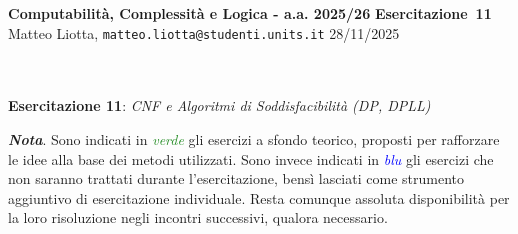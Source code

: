 \documentclass[a4paper,10pt]{article}
\makeatletter
\newcommand{\EsercitazioneNum}{11}
\newcommand{\Data}{28/11/2025}
\newcommand{\DocType}{Esercitazione} %
\newcommand{\FullTitle}{\DocType\ \EsercitazioneNum}
\newcommand{\Header}{
\noindent
  \small \textbf{Computabilità, Complessità e Logica - a.a. 2025/26} \hfill \textbf{\FullTitle} \\[0.2cm]
  \scriptsize Matteo Liotta, \texttt{matteo.liotta@studenti.units.it} \hfill \Data \\[0.2cm]
  \noindent\makebox[\linewidth]{\rule{\linewidth}{0.4pt}} \\[0.3cm]}
\makeatother
\begin{document}
\footnotesize  %
\Header\\[0.7cm]



    
    
    \noindent\Large \textbf{Esercitazione 11}: \textit{CNF e Algoritmi di Soddisfacibilità (DP, DPLL)} 
    \begin{osservazioni}
        \textbf{\textit{Nota}}. Sono indicati in \textcolor{ForestGreen}{\textit{verde}} gli esercizi a sfondo teorico, proposti per rafforzare le idee alla base dei metodi utilizzati. Sono invece indicati in \textcolor{blue}{\textit{blu}} gli esercizi che non saranno trattati durante l'esercitazione, bensì lasciati come strumento aggiuntivo di esercitazione individuale. Resta comunque assoluta disponibilità per la loro risoluzione negli incontri successivi, qualora necessario. 
    \end{osservazioni}
    
\end{document}
